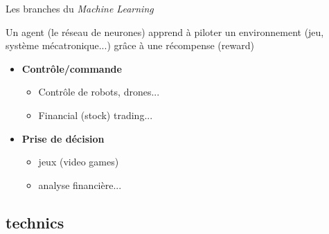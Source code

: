 \documentclass[10pt,serif,mathserif,compress,hyperref={colorlinks}]{beamer}
\begin{document}
\begin{frame}{Les branches du {\em Machine Learning}}
  \begin{tcolorbox}[title={\em Reinforcement learning}\\Apprentissage par renforcement]
    Un agent (le réseau de neurones) apprend à piloter un environnement (jeu, système mécatronique...) grâce à une récompense (reward)
    \begin{itemize}
    \item \textbf{Contrôle/commande}
      \begin{itemize}
      \item Contrôle de robots, drones...
      \item Financial (stock) trading...
      \end{itemize}        
    \item \textbf{Prise de décision}
      \begin{itemize}
      \item jeux (video games)
      \item analyse financière...
      \end{itemize}
    \end{itemize}
  \end{tcolorbox}    
\end{frame}

\subsection{technics}
\end{document}
